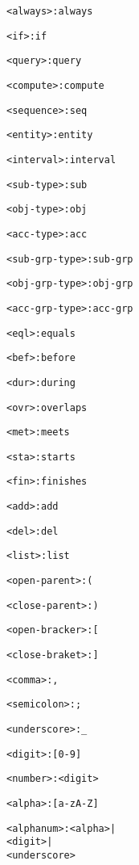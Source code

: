 \documentclass[11pt]{report}
\newenvironment{vverbatim}
{
  \begin{alltt}
}
{
    \vspace{-\baselineskip}
  \end{alltt}
}
\begin{document}
\begin{vverbatim}
<always>                 : always

<if>                     : if

<query>                  : query

<compute>                : compute

<sequence>               : seq

<entity>                 : entity

<interval>               : interval

<sub-type>               : sub

<obj-type>               : obj

<acc-type>               : acc

<sub-grp-type>           : sub-grp

<obj-grp-type>           : obj-grp

<acc-grp-type>           : acc-grp

<eql>                    : equals

<bef>                    : before

<dur>                    : during

<ovr>                    : overlaps

<met>                    : meets

<sta>                    : starts

<fin>                    : finishes

<add>                    : add

<del>                    : del

<list>                   : list

<open-parent>            : (

<close-parent>           : )

<open-bracker>           : [

<close-braket>           : ]

<comma>                  : ,

<semicolon>              : ;

<underscore>             : _

<digit>                  : [0-9]

<number>                 : <digit>

<alpha>                  : [a-zA-Z]

<alphanum>               : <alpha> |
                           <digit> |
                           <underscore>
    \end{vverbatim}
\end{document}

